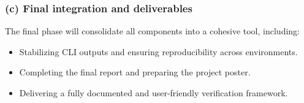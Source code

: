\subsubsection*{(c) Final integration and deliverables}
The final phase will consolidate all components into a cohesive tool, including:
\begin{itemize}[leftmargin=1.5em]
  \item Stabilizing CLI outputs and ensuring reproducibility across environments.
  \item Completing the final report and preparing the project poster.
  \item Delivering a fully documented and user-friendly verification framework.
\end{itemize}